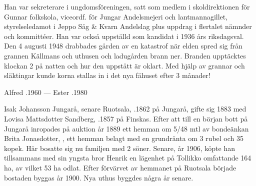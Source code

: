 Han var sekreterare i ungdomsföreningen, satt som medlem i skoldirektionen för Gunnar folkskola, viceordf. för Jungar Andelsmejeri och lantmannagillet, styrelseledamot i Jeppo Såg \& Kvarn Andelslag plus uppdrag i flertalet nämnder och kommittéer. Han var också uppställd som kandidat i 1936 års riksdagsval. Den 4 augusti 1948 drabbades gården av en katastrof när elden spred sig från grannen Källmans och uthusen och ladugården brann ner. Branden upptäcktes klockan 2 på natten och hur den uppstått är oklart. Med hjälp av grannar och släktingar kunde korna stallas in i det nya fähuset efter 3 månader!
\begin{jhchildren}
  \item {}
  \item {}
  \item {}
  \item {}
  \item {}
  \item {}
  \item {}
\end{jhchildren}

Alfred .1960  ---  Ester .1980


%
Isak Johansson Jungarå, senare Ruotsala, .1862 på Jungarå, gifte sig 1883 med Lovisa Mattsdotter Sandberg, .1857 på Finskas. Efter att till en början bott på Jungarå inropades på auktion år 1889 ett hemman om 5/48 mtl av bondeänkan Brita Jonasdotter, , ett hemman belagt med en grundränta om 3 rubel och 35 kopek. Här bosatte sig nu familjen med 2 söner. Senare, år 1906, köpte han tillsammans med sin yngsta bror Henrik en lägenhet på Tollikko omfattande 164 ha, av vilket 53 ha odlat. Efter förvärvet av hemmanet på Ruotsala började bostaden byggas år 1900. Nya uthus byggdes några år senare.

